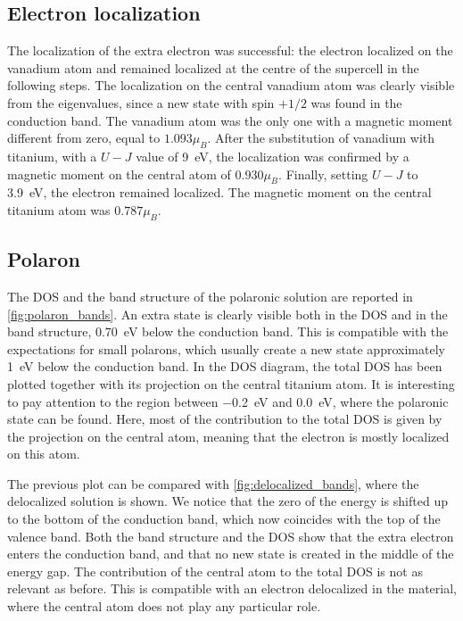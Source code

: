 \subsection{Electron localization}
The localization of the extra electron was successful: the electron localized  on the vanadium atom and remained localized at the centre of the supercell in the following steps. The localization on the central vanadium atom was clearly visible from the  eigenvalues, since a new state with spin $+1/2$ was found in the conduction band. The vanadium atom was the only one with a magnetic moment different from zero, equal to $1.093 \mu_B$. After the substitution of vanadium with titanium, with a $U-J$ value of \SI{9}{eV}, the localization was confirmed by a magnetic moment on the central atom of $0.930 \mu_B$. Finally, setting $U-J$ to \SI{3.9}{eV}, the electron remained localized. The magnetic moment on the central titanium atom was $0.787 \mu_B$.

\subsection{Polaron}
The DOS and the band structure of the polaronic solution are reported in \cref{fig:polaron_bands}. An extra state is clearly visible both in the DOS and in the band structure, \SI{0.70}{eV} below the conduction band. This is compatible with the expectations for small polarons, which usually create a new state approximately \SI{1}{eV} below the conduction band. In the DOS diagram, the total DOS has been plotted together with its projection on the central titanium atom. It is interesting to pay attention to the region between \SI{-0.2}{eV} and \SI{0.0}{eV}, where the polaronic state can be found. Here, most of the contribution to the total DOS is given by the projection on the central atom, meaning that the electron is mostly localized on this atom.

The previous plot can be compared with \cref{fig:delocalized_bands}, where the delocalized solution is shown. We notice that the zero of the energy is shifted up to the bottom of the conduction band, which now coincides with the top of the valence band. Both the band structure and the DOS show that the extra electron enters the conduction band, and that no new state is created in the middle of the energy gap. The contribution of the central atom  to the total DOS is not as relevant as before. This is compatible with an electron delocalized in the material, where the central atom does not play any particular role.

